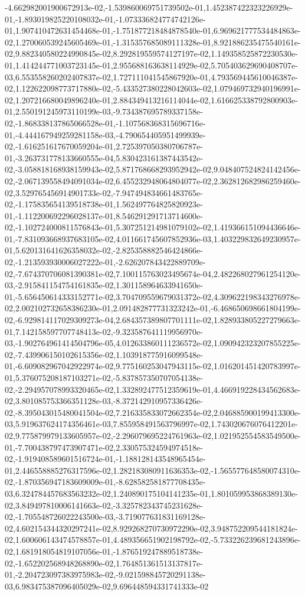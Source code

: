 -4.662982001900672913e-02,-1.539860069751739502e-01,1.452387422323226929e-01,-1.893019825220108032e-01,-1.073336824774742126e-01,1.907410472631454468e-01,-1.751877218484878540e-01,6.969621777534484863e-02,1.270060539245605469e-01,-1.315357685089111328e-01,8.921886235475540161e-02,9.882340580224990845e-02,8.292819559574127197e-02,1.149358525872230530e-01,1.414244771003723145e-01,2.955688163638114929e-02,5.705403629690408707e-03,6.553558260202407837e-02,1.727111041545867920e-01,4.793569445610046387e-02,1.122622098773717880e-02,-5.433527380228042603e-02,1.079469732940196991e-02,1.207216680049896240e-01,2.884349413216114044e-02,1.616625338792800903e-01,2.550191245973110199e-03,-9.734387695789337158e-02,-1.868338137865066528e-01,-1.107568368315696716e-01,-4.444167949259281158e-03,-4.790654405951499939e-02,-1.616251617670059204e-01,2.725397050380706787e-01,-3.263731778133660555e-04,5.830423161387443542e-02,-3.058818168938159943e-02,5.871768668293952942e-02,9.048407524824142456e-02,-2.067139558494091034e-02,6.455232948064804077e-02,2.362812682986259460e-02,3.529765456914901733e-02,-7.947494834661483765e-02,-1.175835654139518738e-01,1.562497764825820923e-01,-1.112200692296028137e-01,8.546291291713714600e-02,-1.102724000811576843e-01,5.307251214981079102e-02,1.419366151094436646e-01,-7.831093668937683105e-02,4.011661745607852936e-03,1.403229832649230957e-01,5.620131641626358032e-02,-2.825358882546424866e-02,-1.213593930006027222e-01,-2.626207843422889709e-02,-7.674370706081390381e-02,7.100115763023495674e-04,2.482268027961254120e-03,-2.915841154754161835e-02,1.301158964633941650e-01,-5.656450614333152771e-02,3.704709559679031372e-02,4.309622198343276978e-02,2.002102732658386230e-01,2.091482877731323242e-01,-6.468650698661804199e-02,-6.929814117029309273e-04,2.684357389807701111e-02,1.828933805227279663e-01,7.142158597707748413e-02,-9.323587641119956970e-03,-1.902764961414504796e-05,4.012633860111236572e-02,1.090942323207855225e-02,-7.439906150102615356e-02,1.103918775916099548e-01,-6.609082967042922974e-02,9.775160253047943115e-02,1.016201451420783997e-01,5.376075208187103271e-02,-5.837857350707054138e-02,-2.294957078993320465e-02,1.332892477512359619e-01,4.466919228434562683e-02,3.801085753366351128e-03,-8.372142910957336426e-02,-8.395043015480041504e-02,7.216335833072662354e-02,2.046885900199413300e-03,5.919637624174356461e-03,7.855958491563796997e-02,1.743020676076412201e-02,9.775879979133605957e-02,-2.296079695224761963e-02,1.021952554583549500e-01,-7.700438797473907471e-02,2.330575324594974518e-02,-1.919408589601516724e-01,-1.188128143548965454e-01,2.446558885276317596e-02,1.282183080911636353e-02,-1.565577648580074310e-02,-1.870356947183609009e-01,-8.628582581877708435e-03,6.324784457683563232e-02,1.240890175104141235e-01,1.801059953868389130e-02,3.849497810006141663e-02,-3.325782343745231628e-02,-1.705548726022243500e-03,-3.719077631831169128e-02,4.602154344320297241e-02,8.929268270730972290e-02,3.948752209544181824e-02,1.600606143474578857e-01,4.489356651902198792e-02,-5.733226239681243896e-02,1.681918054819107056e-01,-1.876519247889518738e-02,-1.652202568948268890e-02,1.764851361513137817e-01,-2.204723097383975983e-02,-9.021598845720291138e-03,6.983475387096405029e-02,9.696448594331741333e-02
